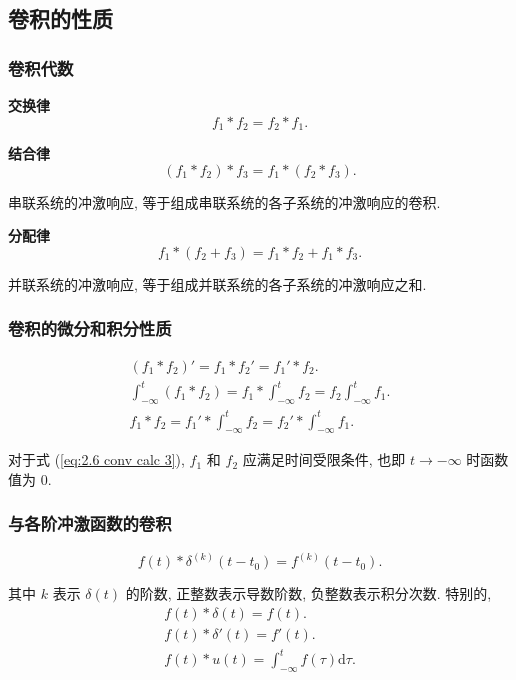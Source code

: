 \subsection{卷积的性质} \label{2 卷积的性质}

\subsubsection{卷积代数}

\textbf{交换律}
\begin{equation}
    f_1*f_2=f_2*f_1.
\end{equation}

\textbf{结合律}
\begin{equation}
    (f_1*f_2)*f_3=f_1*(f_2*f_3).
\end{equation}

串联系统的冲激响应, 等于组成串联系统的各子系统的冲激响应的卷积.

\textbf{分配律}
\begin{equation}
    f_1*(f_2+f_3)=f_1*f_2+f_1*f_3.
\end{equation}

并联系统的冲激响应, 等于组成并联系统的各子系统的冲激响应之和.

\subsubsection{卷积的微分和积分性质}
\rmg
\begin{gather}
    (f_1*f_2)'=f_1*f_2'=f_1'*f_2. \\
    \int_{-\infty}^{t}(f_1*f_2)=f_1*\int_{-\infty}^{t}f_2=f_2\int_{-\infty}^{t}f_1. \\
    f_1*f_2=f_1'*\int_{-\infty}^{t}f_2=f_2'*\int_{-\infty}^{t}f_1. \label{eq:2.6 conv calc 3}
\end{gather}

对于式 (\ref{eq:2.6 conv calc 3}), $f_1$ 和 $f_2$ 应满足时间受限条件, 也即 $t\rightarrow-\infty$ 时函数值为 0.

\subsubsection{与各阶冲激函数的卷积}
\rmg
\begin{equation}
    f(t)*\delta^{(k)}(t-t_0)=f^{(k)}(t-t_0).
\end{equation}

其中 $k$ 表示 $\delta(t)$ 的阶数, 正整数表示导数阶数, 负整数表示积分次数. 特别的,
\begin{gather}
    f(t)*\delta(t)=f(t). \\
    f(t)*\delta'(t)=f'(t). \\
    f(t)*u(t)=\int_{-\infty}^{t}f(\tau)\mathrm{d}\tau.
\end{gather}
